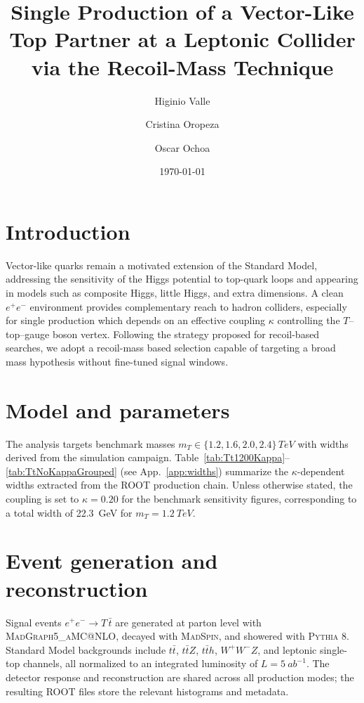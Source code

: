 \documentclass[11pt]{article}
\title{Single Production of a Vector-Like Top Partner at a Leptonic Collider via the Recoil-Mass Technique}
\author[a]{Higinio Valle}
\author[a]{Cristina Oropeza}
\author[a]{Oscar Ochoa}
\affiliation[a]{Universidad Iberoamericana, CDMX, México}
\date{\today}
\begin{document}
\maketitle
\flushbottom
\tableofcontents
\clearpage

\section{Introduction}
Vector-like quarks remain a motivated extension of the Standard Model,
addressing the sensitivity of the Higgs potential to top-quark loops and
appearing in models such as composite Higgs, little Higgs, and extra
dimensions.  A clean $e^{+}e^{-}$ environment provides complementary reach to
hadron colliders, especially for single production which depends on an
effective coupling $\kappa$ controlling the $T$--top--gauge boson vertex.
Following the strategy proposed for recoil-based searches, we adopt a
recoil-mass based selection capable of targeting a broad mass hypothesis without
fine-tuned signal windows.

\section{Model and parameters}
The analysis targets benchmark masses $m_{T}\in\{1.2,1.6,2.0,2.4\}\,\si{TeV}$
with widths derived from the simulation campaign.
Table~\ref{tab:Tt1200Kappa}--\ref{tab:TtNoKappaGrouped} (see
App.~\ref{app:widths}) summarize the $\kappa$-dependent widths extracted from
the ROOT production chain.  Unless otherwise stated, the coupling is set to
$\kappa=0.20$ for the benchmark sensitivity figures, corresponding to a total
width of \SI{22.3}{GeV} for $m_{T} = \SI{1.2}{TeV}$.

\section{Event generation and reconstruction}
Signal events $e^{+}e^{-}\rightarrow T\,\bar{t}$ are generated at parton level
with \textsc{MadGraph5\_aMC@NLO}, decayed with \textsc{MadSpin}, and showered
with \textsc{Pythia 8}.
Standard Model backgrounds include $t\bar{t}$, $t\bar{t}Z$, $t\bar{t}h$,
$W^{+}W^{-}Z$, and leptonic single-top channels, all normalized to an integrated
luminosity of $L=\SI{5}{ab^{-1}}$.  The detector response and reconstruction are
shared across all production modes; the resulting ROOT files store the relevant
histograms and metadata.
\end{document}
